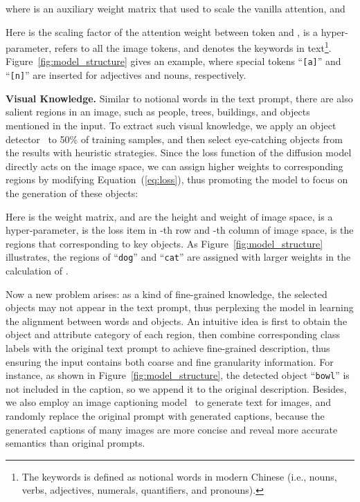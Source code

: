 \documentclass[10pt,twocolumn,letterpaper]{article}
\begin{document}
where  is an auxiliary weight matrix that used to scale the vanilla attention, and

Here  is the scaling factor of the attention weight between token  and ,  is a hyper-parameter,  refers to all the image tokens, and  denotes the keywords in text\footnote{The keywords is defined as notional words in modern Chinese (i.e., nouns, verbs, adjectives, numerals, quantifiers, and pronouns).}. Figure~\ref{fig:model_structure} gives an example, where special tokens ``\verb|[a]|'' and ``\verb|[n]|'' are inserted for adjectives and nouns, respectively.

\noindent\textbf{Visual Knowledge.}
Similar to notional words in the text prompt, there are also salient regions in an image, such as people, trees, buildings, and objects mentioned in the input. 
To extract such visual knowledge, we apply an object detector~\cite{DBLP:conf/cvpr/00010BT0GZ18} to 50\% of training samples, and then select eye-catching objects from the results with heuristic strategies.
Since the loss function of the diffusion model directly acts on the image space, we can assign higher weights to corresponding regions by modifying Equation~(\ref{eq:loss}), thus promoting the model to focus on the generation of these objects:


Here  is the weight matrix,  and  are the height and weight of image space,  is a hyper-parameter,  is the loss item in -th row and -th column of image space,  is the regions that corresponding to key objects. 
As Figure~\ref{fig:model_structure} illustrates, the regions of ``\verb|dog|'' and ``\verb|cat|'' are assigned with larger weights in the calculation of .

Now a new problem arises: as a kind of fine-grained knowledge, the selected objects may not appear in the text prompt, thus perplexing the model in learning the alignment between words and objects.
An intuitive idea is first to obtain the object and attribute category of each region, then combine corresponding class labels with the original text prompt to achieve fine-grained description, thus ensuring the input contains both coarse and fine granularity information.
For instance, as shown in Figure~\ref{fig:model_structure}, the detected object ``\verb|bowl|'' is not included in the caption, so we append it to the original description.
Besides, we also employ an image captioning model~\cite{DBLP:conf/icml/WangYMLBLMZZY22} to generate text for images, and randomly replace the original prompt with generated captions, because the generated captions of many images are more concise and reveal more accurate semantics than original prompts.
\end{document}
